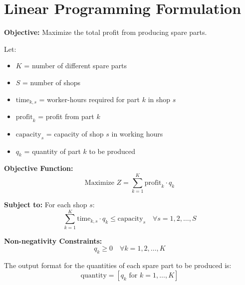 \documentclass{article}
\begin{document}
\section*{Linear Programming Formulation}

\textbf{Objective:} Maximize the total profit from producing spare parts.

Let:
\begin{itemize}
    \item \( K \) = number of different spare parts
    \item \( S \) = number of shops
    \item \( \text{time}_{k,s} \) = worker-hours required for part \( k \) in shop \( s \)
    \item \( \text{profit}_k \) = profit from part \( k \)
    \item \( \text{capacity}_s \) = capacity of shop \( s \) in working hours
    \item \( q_k \) = quantity of part \( k \) to be produced
\end{itemize}

\textbf{Objective Function:}
\[
\text{Maximize } Z = \sum_{k=1}^{K} \text{profit}_k \cdot q_k
\]

\textbf{Subject to:}
For each shop \( s \):
\[
\sum_{k=1}^{K} \text{time}_{k,s} \cdot q_k \leq \text{capacity}_s \quad \forall s = 1, 2, \ldots, S
\]

\textbf{Non-negativity Constraints:}
\[
q_k \geq 0 \quad \forall k = 1, 2, \ldots, K
\]

The output format for the quantities of each spare part to be produced is:
\[
\text{quantity} = [q_k \text{ for } k = 1, \ldots, K]
\]
\end{document}
